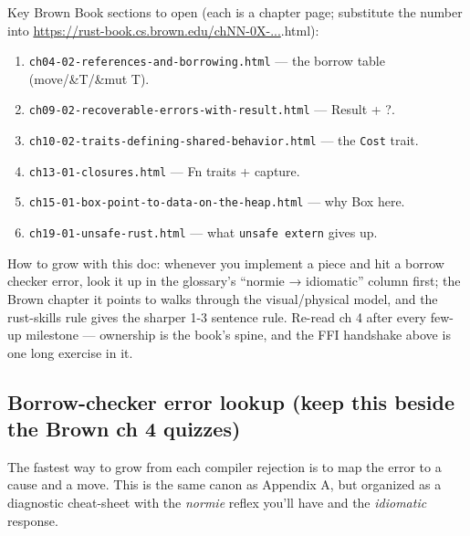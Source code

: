 \documentclass[11pt]{article}
\begin{document}
Key Brown Book sections to open (each is a chapter page; substitute the number
into \url{https://rust-book.cs.brown.edu/chNN-0X-...}.html):

\begin{enumerate}
\item \texttt{ch04-02-references-and-borrowing.html} — the borrow table (move/\&T/\&mut T).
\item \texttt{ch09-02-recoverable-errors-with-result.html} — Result + ?.
\item \texttt{ch10-02-traits-defining-shared-behavior.html} — the \texttt{Cost} trait.
\item \texttt{ch13-01-closures.html} — Fn traits + capture.
\item \texttt{ch15-01-box-point-to-data-on-the-heap.html} — why Box here.
\item \texttt{ch19-01-unsafe-rust.html} — what \texttt{unsafe extern} gives up.
\end{enumerate}

How to grow with this doc: whenever you implement a piece and hit a borrow
checker error, look it up in the glossary's ``normie → idiomatic'' column first;
the Brown chapter it points to walks through the visual/physical model, and the
rust-skills rule gives the sharper 1-3 sentence rule. Re-read ch 4 after every
few-up milestone — ownership is the book's spine, and the FFI handshake above
is one long exercise in it.
\subsection{Borrow-checker error lookup (keep this beside the Brown ch 4 quizzes)}
\label{sec:org0e75856}

The fastest way to grow from each compiler rejection is to map the error to a
cause and a move. This is the same canon as Appendix A, but organized as a
diagnostic cheat-sheet with the \emph{normie} reflex you'll have and the \emph{idiomatic}
response.
\end{document}
